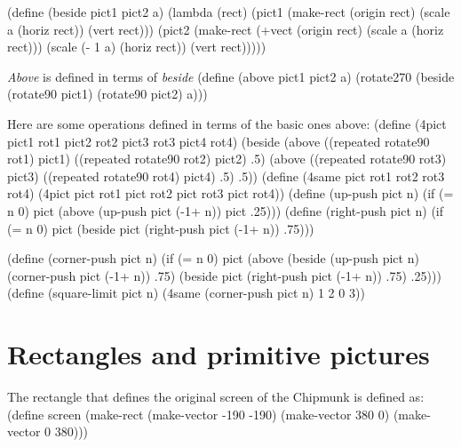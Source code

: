 \beginlisp
(define (beside pict1 pict2 a)
  (lambda (rect)
    (pict1 (make-rect
            (origin rect)
            (scale a (horiz rect))
            (vert rect)))
    (pict2 (make-rect
            (+vect (origin rect)
                   (scale a (horiz rect)))
            (scale (- 1 a) (horiz rect))
            (vert rect)))))
\endlisp

{\it Above} is defined in terms of {\it beside}
\beginlisp
(define (above pict1 pict2 a)
  (rotate270 (beside (rotate90 pict1)
                     (rotate90 pict2)
                     a)))
\endlisp

Here are some operations defined in terms of the basic ones above:
\beginlisp
(define (4pict pict1 rot1 pict2 rot2 pict3 rot3 pict4 rot4)
  (beside (above ((repeated rotate90 rot1) pict1)
                 ((repeated rotate90 rot2) pict2)
                 .5)
          (above ((repeated rotate90 rot3) pict3)
                 ((repeated rotate90 rot4) pict4)
                 .5)
          .5))
\pbrk
(define (4same pict rot1 rot2 rot3 rot4)
  (4pict pict rot1 pict rot2 pict rot3 pict rot4))
\pbrk
(define (up-push pict n)
  (if (= n 0)
      pict
      (above (up-push pict (-1+ n))
             pict
             .25)))
\pbrk
(define (right-push pict n)
  (if (= n 0)
      pict
      (beside pict (right-push pict (-1+ n)) .75)))

\pbrk
(define (corner-push pict n)
  (if (= n 0)
      pict
      (above
       (beside (up-push pict n)
               (corner-push pict (-1+ n))
               .75)
       (beside
        pict
        (right-push pict (-1+ n))
        .75)
       .25)))
\pbrk
(define (square-limit pict n)
  (4same (corner-push pict n) 1 2 0 3))
\endlisp

\section{Rectangles and primitive pictures}

The rectangle that defines the original screen of the Chipmunk is
defined as:
\beginlisp
(define screen (make-rect (make-vector -190 -190) 
                          (make-vector 380 0)
                          (make-vector 0 380)))
\endlisp


